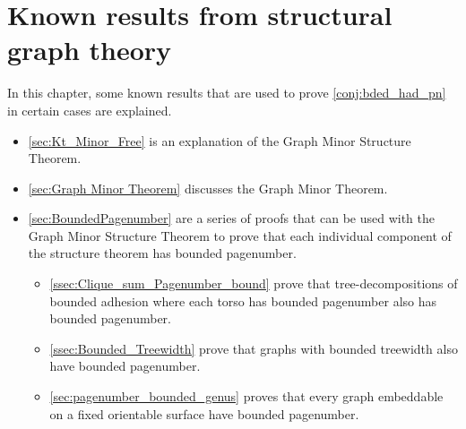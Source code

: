 
\chapter{Known results from structural graph theory}\label{chap:Known results}
In this chapter, some known results that are used to prove \cref{conj:bded_had_pn} in certain cases are explained.

\begin{itemize}
	\item \cref{sec:Kt_Minor_Free} is an explanation of the Graph Minor Structure Theorem.
	\item \cref{sec:Graph Minor Theorem} discusses the Graph Minor Theorem. 
	\item \cref{sec:BoundedPagenumber} are a series of proofs that can be used with the Graph Minor Structure Theorem to prove that each individual component of the structure theorem has bounded pagenumber.
	\begin{itemize}
		\item \cref{ssec:Clique_sum_Pagenumber_bound} prove that tree-decompositions of bounded adhesion where each torso has bounded pagenumber also has bounded pagenumber.
		\item \cref{ssec:Bounded_Treewidth} prove that graphs with bounded treewidth also have bounded pagenumber.
		\item \cref{sec:pagenumber_bounded_genus} proves that every graph embeddable on a fixed orientable surface have bounded pagenumber.
	\end{itemize}
\end{itemize}




